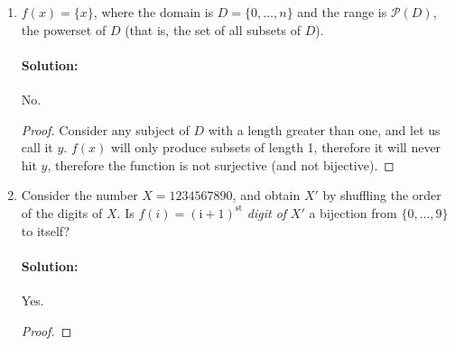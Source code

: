 \documentclass[11pt, notitlepage]{report}
\newcommand{\N}{\mathbb{N}}
\newenvironment{solution}{\paragraph{Solution:}}{\hfill}
\begin{document}
\begin{enumerate}[label=\alph*.)]
\begin{enumerate}[label=(\roman*)]
\begin{solution}
\begin{proof}
       		$(\forall x: x\in \N \setminus \{0\}), (x>p) \implies f(x)=p \implies$ $f$ is not injective, therefore cannot be bijective. (Additionally $\not \exists x : p \bmod x = p$, therefore it is also not surjective.)
       	\end{proof}
        \end{solution}
        \item for domain $\{(p+1)/2, \dots, p\}$ and range $\{0, \dots,
            (p-1)/2\}$
        \begin{solution} Yes.
        	\begin{proof}
        		Let $f : \{(p+1)/2, (p+3)/2, \dots, p\} \rightarrow \{0, \dots, (p-3)/2, (p-1)/2\}$ (slightly more clear articulation of given domain and range).
        		
        		We can prove the injective and surjective properties at the same time. 
        		
        		Each element $x$ in the given domain is greater than half of $p$. This implies that $f(x) = p \bmod x = p-x$, which is unique for each distinct x, implying the injective property holds. Extending this to the elements within the domain, we can see the range is: \begin{align*}
        		 &\{p-\frac{p+1}{2}, p-\frac{p+3}{2}, \dots, p-\frac{p+p}{2}\} \\
        		 &=\{\frac{2p - (p+1)}{2}, \frac{2p -(p+3)}{2}, \dots, \frac{2p -(p+p)}{2}\} \\
        		 &=\{\frac{p-1}{2}, \frac{p-3}{2}, \dots, 0\}
        		\end{align*} 
        		which is equivalent to our range (except in reverse order). Therefore $f$ is also surjective, implying $f$ is bijective.
        	\end{proof}
        \end{solution}
    \end{enumerate}

    \item $f(x) = \{x\}$, where the domain is $D = \{0,\dots, n\}$ and the range 
    is $\mathcal P(D)$, the powerset of $D$ (that is, the set of all subsets of
    $D$).
    \begin{solution}
    	No. 
    	\begin{proof}
    		Consider any subject of $D$ with a length greater than one, and let us call it $y$. $f(x)$ will only produce subsets of length 1, therefore it will never hit $y$, therefore the function is not surjective (and not bijective).
    	\end{proof}
    \end{solution}
    \item Consider the number $X = 1234567890$, and obtain $X'$ by shuffling the
    order of the digits of $X$. Is $f(i) = (\text{i} + 1)^{\text{st}}$ \textit{digit
    of} $X'$ a bijection from $\{0,\dots, 9\}$ to itself?
    \begin{solution}Yes.
    	\begin{proof}
    		

\end{proof}
\end{solution}
\end{enumerate}
\end{document}
